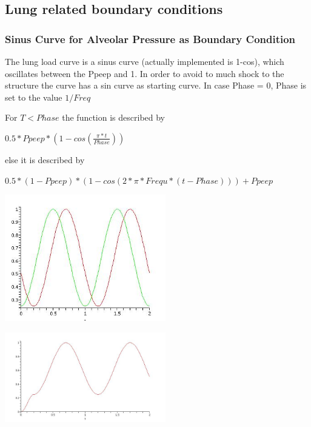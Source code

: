\subsection{Lung related boundary conditions}

\subsubsection*{Sinus Curve for Alveolar Pressure as Boundary Condition}

The lung load curve is a sinus curve (actually implemented is 1-cos),
which oscillates between the Ppeep and 1. In order to avoid to much
shock to the structure the curve has a sin curve as starting curve.
In case Phase = 0, Phase is set to the value $1/Freq$ \bigskip
\par For $T<Phase$ the function is described by 
\begin{center}
$0.5*Ppeep*(1 - cos(\frac{\pi*t}{Phase}))$
\end{center}
\par else it is described by 
\begin{center}
$0.5*(1-Ppeep)*(1 - cos(2*\pi*Frequ*(t - Phase))) + Ppeep$
\end{center}

\begin{center}
\includegraphics[width=70mm]{figures/phase}
\end{center}

\begin{center}
\includegraphics[width=70mm]{figures/start}
\end{center}


